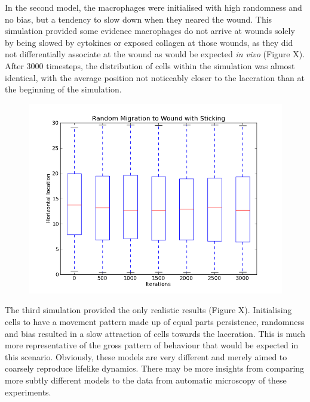 \documentclass[12pt]{article}
\begin{document}
In the second model, the macrophages were initialised with high 
randomness and no bias, but a tendency to slow down when they neared the 
wound. This simulation provided some evidence macrophages do not arrive 
at wounds solely by being slowed by cytokines or exposed collagen at 
those wounds, as they did not differentially associate at the wound as 
would be expected {\itshape in vivo} (Figure X). After 3000 timesteps, 
the distribution of cells within the simulation was almost identical, 
with the average position not noticeably closer to the laceration than 
at the beginning of the simulation.\begin{figure}[H]
\centering
\includegraphics[width=11.51cm]{media/RandomMigrationtoWound.png}
\end{figure}

The third simulation provided the only realistic results (Figure X). 
Initialising cells to have a movement pattern made up of equal parts 
persistence, randomness and bias resulted in a slow attraction of cells 
towards the laceration. This is much more representative of the gross 
pattern of behaviour that would be expected in this scenario. Obviously, 
these models are very different and merely aimed to coarsely reproduce 
lifelike dynamics. There may be more insights from comparing more subtly 
different models to the data from automatic microscopy of these 
experiments.
\end{document}
